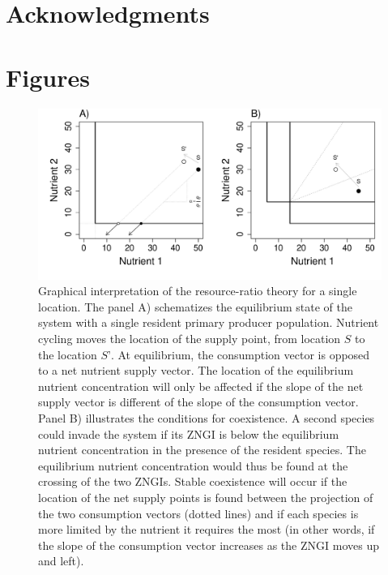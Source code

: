 \documentclass[12pt]{paper}
\begin{document}
\section{Acknowledgments}
\newpage

\printbibliography

\newpage

\section{Figures}

\begin{figure}[p]
   \centering
   \includegraphics[width=\textwidth]{R-Ratio_theory.pdf}
   \caption{Graphical interpretation of the resource-ratio theory for a single location. The panel A) schematizes the equilibrium state of the system with a single resident primary producer population. Nutrient cycling moves the location of the supply point, from location $S$ to the location $S’$. At equilibrium, the consumption vector is opposed to a net nutrient supply vector. The location of the equilibrium nutrient concentration will only be affected if the slope of the net supply vector is different of the slope of the consumption vector. Panel B) illustrates the conditions for coexistence. A second species could invade the system if its ZNGI is below the equilibrium nutrient concentration in the presence of the resident species. The equilibrium nutrient concentration would thus be found at the crossing of the two ZNGIs. Stable coexistence will occur if the location of the net supply points is found between the projection of the two consumption vectors (dotted lines) and if each species is more limited by the nutrient it requires the most (in other words, if the slope of the consumption vector increases as the ZNGI moves up and left).}
   \label{f:R-Ratio_theory}
\end{figure}
\newpage
\end{document}

